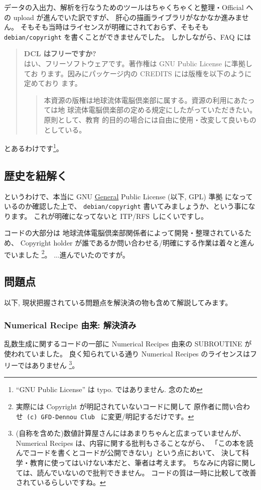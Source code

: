 \documentclass[mingoth,a4paper,twoside]{jsarticle}
\begin{document}
データの入出力、解析を行なうためのツールはちゃくちゃくと整理・Official への upload が進んでいた訳ですが、
肝心の描画ライブラリがなかなか進みません。
%
そもそも当時はライセンスが明確にされておらず、そもそも \texttt{debian/copyright} を書くことができませんでした。
しかしながら、FAQ \cite{DCL-FAQ} には
\begin{quotation}
  \noindent
  \textbf{DCL はフリーですか?} \\
  はい、フリーソフトウェアです。著作権は GNU Public License に準拠してお
  ります。因みにパッケージ内の CREDITS には版権を以下のように定めており
  ます。
  \begin{quote}
    本資源の版権は地球流体電脳倶楽部に属する。資源の利用にあたっては地
    球流体電脳倶楽部の定める規定にしたがっていただきたい。原則として、教育
    的目的の場合には自由に使用・改変して良いものとしている。
  \end{quote}
\end{quotation}
とあるわけです\footnote{``GNU Public License'' は typo. ではありません. 念のため}。

\subsection{%
  歴史を紐解く
}

というわけで、本当に GNU \underline{General} Public License (以下, GPL) 準拠%
になっているのか確認した上で、
\texttt{debian/copyright} 書いてみましょうか、という事になります。
これが明確になってないと ITP/RFS しにくいですし。

コードの大部分は
地球流体電脳倶楽部関係者によって開発・整理されているため、
Copyright holder が誰であるか問い合わせる/明確にする作業は着々と進んでいました
\footnote{%
  実際には Copyright が明記されていないコードに関して
  原作者に問い合わせ\texttt{ (c) GFD-Dennou Club } に変更/明記するだけです。
}。
...進んでいたのですが。

\subsection{%
  問題点
}
以下, 現状把握されている問題点を解決済の物も含めて解説してみます。


\subsubsection{%
  Numerical Recipe 由来: 解決済み%
}

乱数生成に関するコードの一部に Numerical Recipes 由来の SUBROUTINE が使われていました。
良く知られている通り Numerical Recipes のライセンスはフリーではありません
\footnote{%
  (自称を含めた)数値計算屋さんにはあまりちゃんと広まっていませんが、
  Numerical Recipes は、内容に関する批判もさることながら、%
  「この本を読んでコードを書くとコードが公開できない」という点において、%
  決して科学・教育に使ってはいけない本だと、筆者は考えます。
  ちなみに内容に関しては、読んでいないので批判できません。
  コードの質は一時に比較して改善されているらしいですね。
}。
\end{document}
